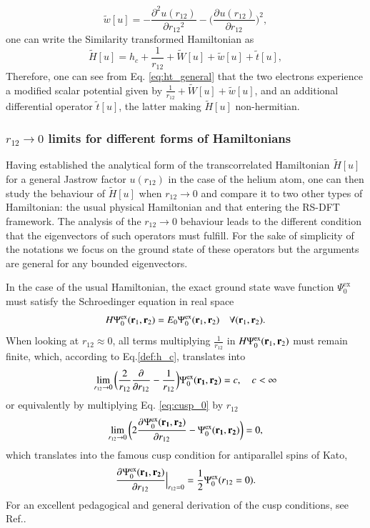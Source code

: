\documentclass[aip,jcp,reprint,noshowkeys,superscriptaddress]{revtex4-1}
\newcommand{\deriv}[3]{\frac{\partial^{#3} #1}{\partial {#2}^{#3}}}
\newcommand{\bd}[1]{{\bf {#1}}}
\newcommand{\br}[0]{{\bf {r}}}
\newcommand{\psiex}[0]{\Psi^{\text{ex}}_0}
\begin{document}
\begin{equation}
 \label{eq:def_wt}
 \tilde{w}[u] = -\deriv{u(r_{12})}{r_{12}}{2} - \bigg( \deriv{u(r_{12})}{r_{12}}{} \bigg)^2, 
\end{equation}
one can write the Similarity transformed Hamiltonian  as
\begin{equation}
 \label{eq:ht_general}
 \tilde{H}[u] = h_c + \frac{1}{r_{12}}  + \tilde{W}[u] + \tilde{w}[u] + \tilde{t}[u] ,
\end{equation}
Therefore, one can see from Eq. \eqref{eq:ht_general} that the two electrons experience a modified scalar potential given by $\frac{1}{r_{12}}  + \tilde{W}[u] + \tilde{w}[u]$, and an additional differential operator $\tilde{t}[u]$, 
the latter making $\tilde{H}[u]$ non-hermitian.   

\subsubsection{$r_{12} \rightarrow 0$ limits for different forms of Hamiltonians}
\label{sec:cusp}
Having established the analytical form of the transcorrelated Hamiltonian $\tilde{H}[u]$ for a general Jastrow factor $u(r_{12})$ in the case of the helium atom, one can then study the behaviour of $\tilde{H}[u]$ when $r_{12}\rightarrow 0$ and compare it to two other types of Hamiltonian: the usual physical Hamiltonian and that entering the RS-DFT framework. 
The analysis of the $r_{12}\rightarrow 0$ behaviour leads to the different condition that the eigenvectors of such operators must fulfill. For the sake of simplicity of the notations we focus on the ground state of these operators but the arguments are general for any bounded eigenvectors. 

In the case of the usual Hamiltonian, the exact ground state wave function $\psiex$ must satisfy the Schroedinger equation in real space 
\begin{equation}
 H \psiex(\br{}_1,\br{}_2) = E_0 \psiex(\br{}_1,\br{}_2)\quad \forall (\br{}_1,\br{}_2).
\end{equation}
When looking at $r_{12}\approx 0$, all terms multiplying $\frac{1}{r_{12}}$ in $H \psiex(\br{}_1,\br{}_2)$ must remain finite, which, according to Eq.\eqref{def:h_c}, translates into
\begin{equation}
 \label{eq:cusp_0}
 \lim_{r_{12}\rightarrow 0}\bigg( \frac{2}{r_{12}} \deriv{}{r_{12}}{} -\frac{1}{r_{12}}\bigg) \psiex(\bd{r_1},\bd{r_2})  = c,\quad c<\infty 
\end{equation}
or equivalently by multiplying Eq. \eqref{eq:cusp_0} by $r_{12}$
\begin{equation}
 \lim_{r_{12}\rightarrow 0}\bigg( 2 \deriv{\psiex(\bd{r_1},\bd{r_2})}{r_{12}}{} -\psiex(\bd{r_1},\bd{r_2}) \bigg) = 0, 
\end{equation}
which translates into the famous cusp condition for antiparallel spins of Kato\cite{Kat-CPAM-57}, 
\begin{equation}
 \deriv{\psiex(\bd{r_1},\bd{r_2})}{r_{12}}{}\Bigr|_{r_{12}=0} = \frac{1}{2} \psiex(r_{12}=0). 
\end{equation} 
For an excellent pedagogical and general derivation of the cusp conditions, see Ref.. 
\end{document}
